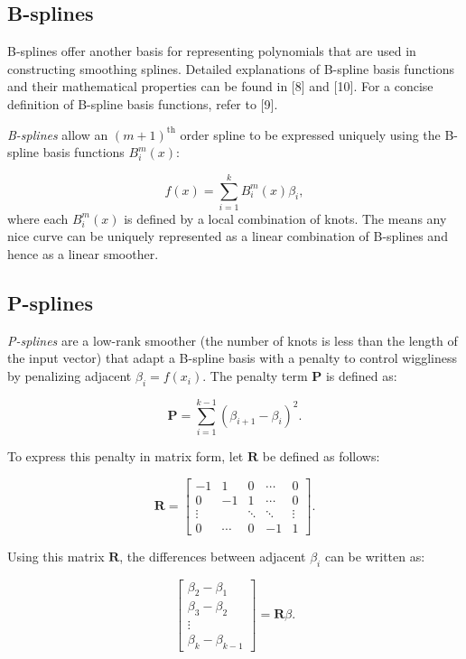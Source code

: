 \documentclass[
11pt, %
oneside, %
english, %
singlespacing, %
]{macthesis} %
\begin{document}
\subsection{B-splines}\label{B-splines}

B-splines offer another basis for representing polynomials that are used in constructing smoothing splines. Detailed explanations of B-spline basis functions and their mathematical properties can be found in {[}8{]} and {[}10{]}. For a concise definition of B-spline basis functions, refer to {[}9{]}.

\emph{B-splines} allow an \((m+1)^{\text{th}}\) order spline to be expressed uniquely using the B-spline basis functions \(B_i^m(x)\):

\[
f(x) = \sum_{i=1}^{k} B_i^m(x) \beta_i,
\]
where each \(B_i^m(x)\) is defined by a local combination of knots. The means any nice curve can be uniquely represented as a linear combination of B-splines and hence as a linear smoother.

\subsection{P-splines}\label{P-splines}

\emph{P-splines} are a low-rank smoother (the number of knots is less than the length of the input vector) that adapt a B-spline basis with a penalty to control wiggliness by penalizing adjacent \(\beta_i = f(x_i)\). The penalty term \(\mathbf{P}\) is defined as:

\[
\mathbf{P} = \sum^{k-1}_{i=1}(\beta_{i+1}-\beta_i)^2.
\]

To express this penalty in matrix form, let \(\mathbf{R}\) be defined as follows:

\[
\mathbf{R} = \begin{bmatrix}
-1 & 1 & 0 & \cdots & 0 \\
0 & -1 & 1 & \cdots & 0 \\
\vdots & & \ddots & \ddots & \vdots \\
0 & \cdots & 0 & -1 & 1 
\end{bmatrix}.
\]

Using this matrix \(\mathbf{R}\), the differences between adjacent \(\beta_i\) can be written as:

\[
\begin{bmatrix}
\beta_2 - \beta_1 \\
\beta_3 - \beta_2 \\
\vdots \\
\beta_k - \beta_{k-1}
\end{bmatrix}
= \mathbf{R} \beta.
\]
\end{document}

